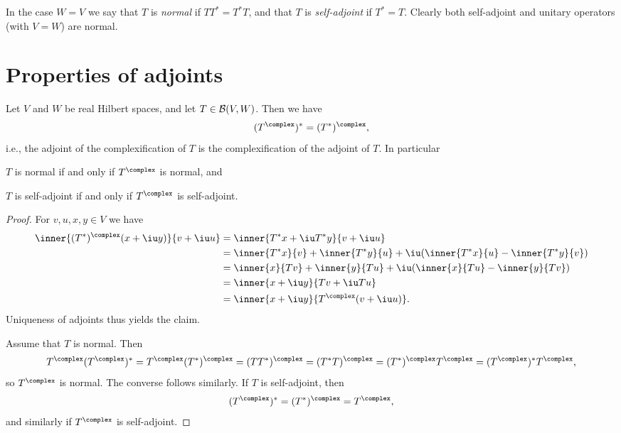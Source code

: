 \documentclass[a4paper, 11pt]{memoir}
\numberwithin{equation}{chapter}
\begin{document}
In the case $W = V$ we say that $T$ is \emph{normal} if $TT^* = T^*T$, and that $T$ is \emph{self-adjoint} if $T^* = T$. Clearly both self-adjoint and unitary operators (with $V = W$) are normal.


\section{Properties of adjoints}

\begin{proposition}
    \label{prop:complexification-adjoint}
    Let $V$ and $W$ be real Hilbert spaces, and let $T \in \mathcal{B}(V,W)$. Then we have
    \begin{equation*}
        (T^\complex)^*
            = (T^*)^\complex,
    \end{equation*}
    i.e., the adjoint of the complexification of $T$ is the complexification of the adjoint of $T$. In particular
    \begin{enumprop}
        \item $T$ is normal if and only if $T^\complex$ is normal, and
        \item $T$ is self-adjoint if and only if $T^\complex$ is self-adjoint.
    \end{enumprop}
\end{proposition}

\begin{proof}
    For $v,u,x,y \in V$ we have
    \begin{align*}
        \inner{(T^*)^\complex(x + \iu y)}{v + \iu u}
            &= \inner{ T^*x + \iu T^*y }{v + \iu u} \\
            &= \inner{T^*x}{v}
                + \inner{T^*y}{u}
                + \iu ( \inner{T^*x}{u} - \inner{T^*y}{v} ) \\
            &= \inner{x}{Tv}
                + \inner{y}{Tu}
                + \iu ( \inner{x}{Tu} - \inner{y}{Tv} ) \\
            &= \inner{x + \iu y}{Tv + \iu Tu} \\
            &= \inner{x + \iu y}{T^\complex(v + \iu u)}.
    \end{align*}
    Uniqueness of adjoints thus yields the claim.

    Assume that $T$ is normal. Then
    \begin{equation*}
        T^\complex (T^\complex)^*
            = T^\complex (T^*)^\complex
            = (TT^*)^\complex
            = (T^*T)^\complex
            = (T^*)^\complex T^\complex
            = (T^\complex)^* T^\complex,
    \end{equation*}
    so $T^\complex$ is normal. The converse follows similarly. If $T$ is self-adjoint, then
    \begin{equation*}
        (T^\complex)^*
            = (T^*)^\complex
            = T^\complex,
    \end{equation*}
    and similarly if $T^\complex$ is self-adjoint.
\end{proof}
\end{document}
